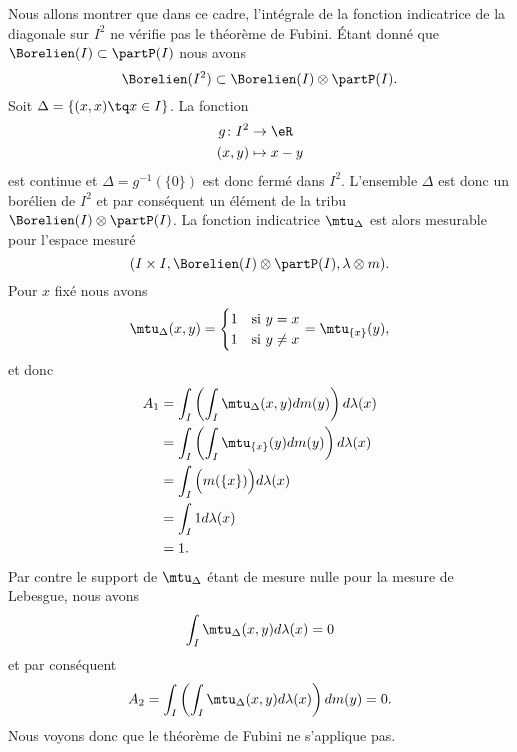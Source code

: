 \begin{example}
    Nous allons montrer que dans ce cadre, l'intégrale de la fonction indicatrice de la diagonale sur \( I^2\) ne vérifie pas le théorème de Fubini. Étant donné que \( \Borelien(I)\subset\partP(I)\) nous avons
    \begin{equation}
        \Borelien(I^2)\subset\Borelien(I)\otimes\partP(I).
    \end{equation}
    Soit \( \Delta=\{ (x,x)\tq x\in I \}\). La fonction
    \begin{equation}
        \begin{aligned}
            g\colon I^2&\to \eR \\
            (x,y)&\mapsto x-y
        \end{aligned}
    \end{equation}
    est continue et \( \Delta=g^{-1}(\{ 0 \})\) est donc fermé dans \( I^2\). L'ensemble \( \Delta\) est donc un borélien de \( I^2\) et par conséquent un élément de la tribu \( \Borelien(I)\otimes\partP(I)\). La fonction indicatrice \( \mtu_{\Delta}\) est alors mesurable pour l'espace mesuré
    \begin{equation}
        (I\times I,\Borelien(I)\otimes\partP(I),\lambda\otimes m).
    \end{equation}
    Pour \( x\) fixé nous avons
    \begin{equation}
        \mtu_{\Delta}(x,y)=\begin{cases}
            1    &   \text{si } y= x\\
            1    &    \text{si } y\neq x
        \end{cases}=\mtu_{\{ x \}}(y),
    \end{equation}
    et donc
    \begin{subequations}
        \begin{align}
            A_1&=\int_I\left( \int_I\mtu_{\Delta}(x,y)dm(y) \right)d\lambda(x)\\
            &=\int_I\left( \int_I\mtu_{\{ x \}}(y)dm(y) \right)d\lambda(x)\\
            &=\int_I\Big( m(\{ x \}) \Big)d\lambda(x)\\
            &=\int_I 1d\lambda(x)\\
            &=1.
        \end{align}
    \end{subequations}
    Par contre le support de \( \mtu_{\Delta}\) étant de mesure nulle pour la mesure de Lebesgue, nous avons
    \begin{equation}
        \int_I\mtu_{\Delta}(x,y)d\lambda(x)=0
    \end{equation}
    et par conséquent
    \begin{equation}
        A_2=\int_I\left( \int_I\mtu_{\Delta}(x,y)d\lambda(x) \right)dm(y)=0.
    \end{equation}
    Nous voyons donc que le théorème de Fubini ne s'applique pas.
\end{example}

